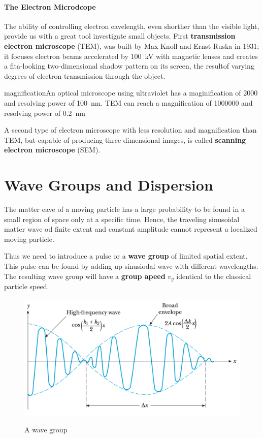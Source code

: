         \paragraph{The Electron Microdcope} %
        \label{par:The Electron Microdcope}
        The ability of controlling electron eavelength, even shorther than the visible light, provide us with a great tool investigate small objects.
        First \textbf{transmission electron microscope} (TEM), was built by Max Knoll and Ernst Ruska in 1931; it focuses electron beams accelerated by \SI{100}{kV}
        with magnetic lenses
        and creates a flta-looking two-dimensional shadow pattern on its screen, the resultof varying degrees of electron transmission through the object.
        
        \bulletpar magnificationAn optical microscope using ultraviolet has a maginification of 2000 and resolving power of \SI{100}{nm}. TEM can reach a magnification of \num{1000000}
        and resolving power of \SI{0.2}{nm}

        \bulletpar A second type of electron microscope with less resolution and magnification than TEM, but capable of producing three-dimensional images, is
        called \textbf{scanning electron microscope} (SEM).

    \section{Wave Groups and Dispersion}
        The matter eave of a moving particle has a large probability to be found in a small region of space only at a specific time. Hence, the traveling 
        sinusoidal matter wave od finite extent and constant amplitude cannot represent a localized moving particle.

        \bulletpar Thus we need to introduce a pulse or a \textbf{wave group} of limited spatial extent. This pulse can be found by adding up sinusiodal wave with 
        different wavelengths. The resulting wave group will have a \textbf{group apeed} $v_g$ identical to the classical particle speed.

        \begin{figure}
            \includegraphics[width=0.9\linewidth]{figures/group-wave.png}
            \label{fig:wave group}
            \caption{A wave group}
        \end{figure}

